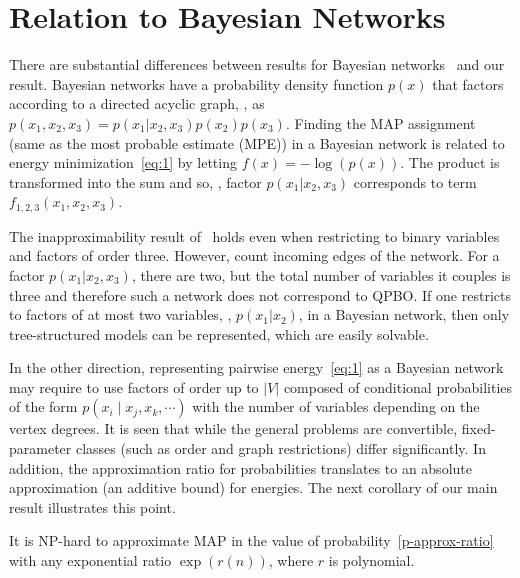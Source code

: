 \section{Relation to Bayesian Networks}\label{sec:BayesNet}
There are substantial differences between results for Bayesian networks~\cite{Abdelbar-98} and our result.
Bayesian networks have a probability density function $p(x)$ that factors according to a directed acyclic graph, \eg, as $p(x_1,x_2,x_3) = p(x_1 | x_2,x_3)p(x_2)p(x_3)$.
Finding the MAP assignment (same as the most probable estimate (MPE)) in a Bayesian network is related to energy minimization~\eqref{eq:1} by letting $f(x) = -\log(p(x))$. The product is transformed into the sum and so, \eg, factor $p(x_1 | x_2,x_3)$ corresponds to term $f_{1,2,3}(x_1,x_2,x_3)$.
\par
The inapproximability result of~\citet{Abdelbar-98} holds even when restricting to binary variables and factors of order three. However, \cite[Section 6.1]{Abdelbar-98} count incoming edges of the network. For a factor $p(x_1 | x_2,x_3)$, there are two, but the total number of variables it couples is three and therefore such a network does not correspond to QPBO. If one restricts to factors of at most two variables, \eg, $p(x_1 | x_2)$, in a Bayesian network, then only tree-structured models can be represented, which are easily solvable. 
\par
In the other direction, representing pairwise energy~\eqref{eq:1} as a Bayesian network may require to use factors of order up to $|V|$ composed of conditional probabilities of the form $p(x_i \mid x_j, x_k, \cdots )$ with the number of variables depending on the vertex degrees. It is seen that while the general problems are convertible, fixed-parameter classes (such as order and graph restrictions) differ significantly. In addition, the approximation ratio for probabilities translates to an absolute approximation (an additive bound) for energies. The next corollary of our main result illustrates this point.

\begin{corollary}\label{C:prob-approx}
It is NP-hard to approximate MAP in the value of probability~\eqref{p-approx-ratio} with any exponential ratio $\exp(r(n))$, where $r$ is polynomial.
\end{corollary}


